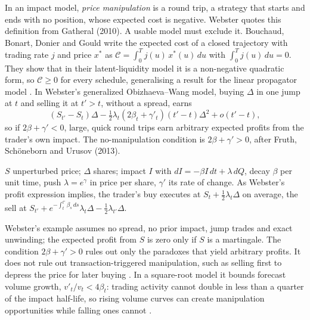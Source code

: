 \begin{qfresult}\label{res:no-price-manipulation}
 In an impact model, \emph{price manipulation} is a round trip, a strategy that starts and ends with no position, whose expected cost is negative. Webster quotes this definition from Gatheral (2010)\citep[chap.~1, n.~3, p.~7]{wide-webster-price-impact}. A usable model must exclude it. Bouchaud, Bonart, Donier and Gould write the expected cost of a closed trajectory with trading rate $j$ and price $x^*$ as $\mathcal C=\int_0^Tj(u)\,x^*(u)\,du$ with $\int_0^Tj(u)\,du=0$. They show that in their latent-liquidity model it is a non-negative quadratic form, so $\mathcal C\ge0$ for every schedule, generalising a result for the linear propagator model \citep[chap.~19, sec.~19.5, pp.~361--362]{catalogue-0528}. In Webster's generalized Obizhaeva--Wang model, buying $\Delta$ in one jump at $t$ and selling it at $t'>t$, without a spread, earns
\[ (S_{t'}-S_t)\Delta-\tfrac12\lambda_t(2\beta_t+\gamma'_t)(t'-t)\Delta^2+o(t'-t), \]
so if $2\beta+\gamma'<0$, large, quick round trips earn arbitrary expected profits from the trader's own impact. The no-manipulation condition is $2\beta+\gamma'>0$, after Fruth, Schöneborn and Urusov (2013)\citep[chap.~2, sec.~2.7.1, Example~2.7.1, p.~94]{wide-webster-price-impact}.

 $S$ unperturbed price; $\Delta$ shares; impact $I$ with $dI=-\beta I\,dt+\lambda\,dQ$, decay $\beta$ per unit time, push $\lambda=e^\gamma$ in price per share, $\gamma'$ its rate of change. As Webster's profit expression implies, the trader's buy executes at $S_t+\tfrac12\lambda_t\Delta$ on average, the sell at $S_{t'}+e^{-\int_t^{t'}\beta_s\,ds}\lambda_t\Delta-\tfrac12\lambda_{t'}\Delta$.

 Webster's example assumes no spread, no prior impact, jump trades and exact unwinding; the expected profit from $S$ is zero only if $S$ is a martingale. The condition $2\beta+\gamma'>0$ rules out only the paradoxes that yield arbitrary profits. It does not rule out transaction-triggered manipulation, such as selling first to depress the price for later buying \citep[same sec., pp.~94--95]{wide-webster-price-impact}. In a square-root model it bounds forecast volume growth, $v'_t/v_t<4\beta_t$: trading activity cannot double in less than a quarter of the impact half-life, so rising volume curves can create manipulation opportunities while falling ones cannot \citep[same chap., sec.~2.7.3, Example~2.7.2, p.~96]{wide-webster-price-impact}.


\end{qfresult}
